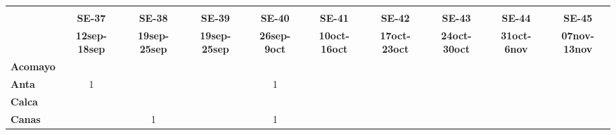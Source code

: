 \begin{tabular}{lccccccccc}
	\textbf{}              & \multicolumn{1}{l}{}                        & \multicolumn{1}{l}{}      & \multicolumn{1}{l}{}                         & \multicolumn{1}{l}{}                         & \multicolumn{1}{l}{}                         & \multicolumn{1}{l}{}                        & \multicolumn{1}{l}{}                         & \multicolumn{1}{l}{}                         & \multicolumn{1}{l}{}     \\
	\textbf{}                                    & \textbf{SE-37}                             
	& \textbf{SE-38}                             & \textbf{SE-39}                               & \textbf{SE-40}                               & \textbf{SE-41}                               & \textbf{SE-42}                               & \textbf{SE-43}                   & \textbf{SE-44} & \textbf{SE-45}  \\
	\textbf{}            & \textbf{12sep-18sep} & \textbf{19sep-25sep} & \textbf{19sep-25sep} & \textbf{26sep-9oct} & \textbf{10oct-16oct} & \textbf{17oct-23oct} & \textbf{24oct-30oct}  & \textbf{31oct-6nov}   & \textbf{07nov-13nov}\\
	\textbf{Acomayo}                                                              & \cellcolor[HTML]{FCC46C}                & \cellcolor[HTML]{FCC46C}                   & \cellcolor[HTML]{FCC46C}         & \cellcolor[HTML]{FCC46C}                & \cellcolor[HTML]{FCC46C}                   & \cellcolor[HTML]{FCC46C}         & \cellcolor[HTML]{FCC46C}                & \cellcolor[HTML]{FCC46C}  			       & \cellcolor[HTML]{FCC46C}\\
	\textbf{Anta}                                                                 & 1                                       & \cellcolor[HTML]{FCC46C}                   & \cellcolor[HTML]{FCC46C}         & 1                   					& \cellcolor[HTML]{FCC46C}                   & \cellcolor[HTML]{FCC46C}         & \cellcolor[HTML]{FCC46C} 			    & \cellcolor[HTML]{FCC46C} 				   & \cellcolor[HTML]{FCC46C}\\
	\textbf{Calca}      				       & \cellcolor[HTML]{FCC46C}         & \cellcolor[HTML]{FCC46C}                & \cellcolor[HTML]{FCC46C}                   & \cellcolor[HTML]{FCC46C}         & \cellcolor[HTML]{FCC46C}                & \cellcolor[HTML]{FCC46C}                   & \cellcolor[HTML]{FCC46C}  		  & \cellcolor[HTML]{FCC46C}                & \cellcolor[HTML]{FCC46C} \\
	\textbf{Canas}                             & \cellcolor[HTML]{FCC46C}         & 1              &\cellcolor[HTML]{FCC46C}                  &1                     

\end{tabular}
